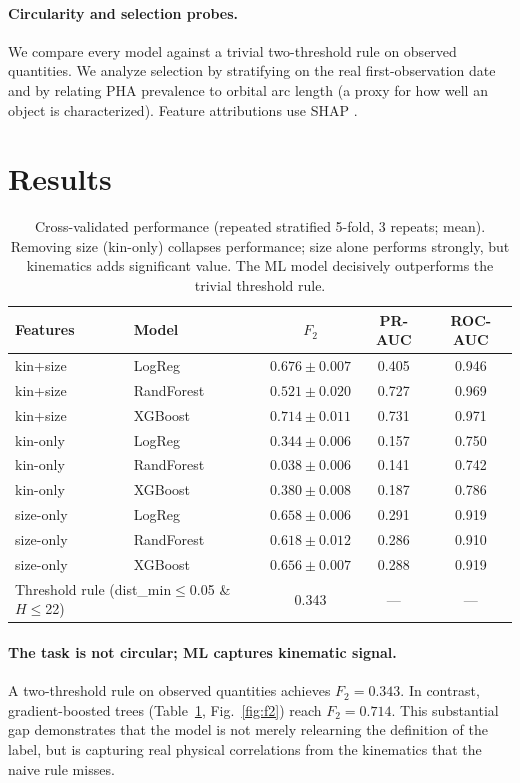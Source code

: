 \documentclass[11pt]{article}
\begin{document}
\paragraph{Circularity and selection probes.}
We compare every model against a trivial two-threshold rule on observed quantities. We
analyze selection by stratifying on the real first-observation date and by relating
PHA prevalence to orbital arc length (a proxy for how well an object is
characterized). Feature attributions use SHAP \citep{shap}.

\section{Results}

\begin{table}[t]
\centering
\caption{Cross-validated performance (repeated stratified 5-fold, 3 repeats; mean).
Removing size (kin-only) collapses performance; size alone performs strongly, but
kinematics adds significant value. The ML model decisively outperforms the trivial threshold rule.}
\label{tab:cv}
\begin{tabular}{llccc}
\toprule
Features & Model & $F_2$ & PR-AUC & ROC-AUC \\
\midrule
kin+size  & LogReg     & $0.676\pm0.007$ & 0.405 & 0.946 \\
kin+size  & RandForest & $0.521\pm0.020$ & 0.727 & 0.969 \\
kin+size  & XGBoost    & $0.714\pm0.011$ & 0.731 & 0.971 \\
kin-only  & LogReg     & $0.344\pm0.006$ & 0.157 & 0.750 \\
kin-only  & RandForest & $0.038\pm0.006$ & 0.141 & 0.742 \\
kin-only  & XGBoost    & $0.380\pm0.008$ & 0.187 & 0.786 \\
size-only & LogReg     & $0.658\pm0.006$ & 0.291 & 0.919 \\
size-only & RandForest & $0.618\pm0.012$ & 0.286 & 0.910 \\
size-only & XGBoost    & $0.656\pm0.007$ & 0.288 & 0.919 \\
\midrule
\multicolumn{2}{l}{Threshold rule (dist\_min$\le$0.05 \& $H\le$22)} & 0.343 & --- & --- \\
\bottomrule
\end{tabular}
\end{table}

\paragraph{The task is not circular; ML captures kinematic signal.}
A two-threshold rule on observed quantities achieves $F_2=0.343$. In contrast,
gradient-boosted trees (Table~\ref{tab:cv}, Fig.~\ref{fig:f2}) reach $F_2=0.714$.
This substantial gap demonstrates that the model is not merely relearning the
definition of the label, but is capturing real physical correlations from the
kinematics that the naive rule misses.
\end{document}
